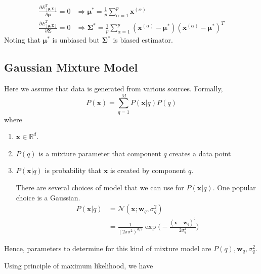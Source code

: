 \begin{align*}
	\frac{ \partial	E^T_{[ \boldsymbol{\mu}, \boldsymbol{\Sigma} ]}}{ \partial \boldsymbol{\mu}} =0 &\Rightarrow \boldsymbol{\mu}^* = \frac{1}{p} \sum_{\alpha=1}^{p}\boldsymbol{x}^{(\alpha)}\\
		\frac{ \partial	E^T_{[ \boldsymbol{\mu}, \boldsymbol{\Sigma} ]}}{ \partial \boldsymbol{\Sigma}} =0 &\Rightarrow \boldsymbol{\Sigma}^* = \frac{1}{p} \sum_{\alpha=1}^{p}(\boldsymbol{x}^{(\alpha)}-\boldsymbol{\mu}^*)(\boldsymbol{x}^{(\alpha)}-\boldsymbol{\mu}^*)^T
\end{align*}
Noting that $\boldsymbol{\mu}^*$ is unbiased but $\boldsymbol{\Sigma}^*$ is biased estimator.

\subsection{Gaussian Mixture Model}
Here we assume that data is generated from various sources. Formally, 
$$
P(\boldsymbol{x}) = \sum_{q=1}^{M} P(\boldsymbol{x}|q)P(q)
$$
where
\begin{enumerate}
	\item $\boldsymbol{x} \in \mathbb{R}^d$.
	\item $P(q)$ is a mixture parameter that component $q$ creates a data point
	\item $P(\boldsymbol{x}|q)$ is probability that $\boldsymbol{x}$ is created by component $q$.
	
	There are several choices of model that we can use for $P(\boldsymbol{x}|q)$. One popular choice is a Gaussian. 
\begin{align*}
		P(\boldsymbol{x}|q) &= \mathcal{N}(\boldsymbol{x}; \boldsymbol{w}_q, \sigma_q^2 ) \\
		&= \frac{1}{(2\pi\sigma^2)^{d/2}}\exp{ \bigg( - \frac{(\boldsymbol{x}-\boldsymbol{w}_q)^2}{2\sigma^2_q} \bigg) }
\end{align*}

\end{enumerate}


Hence, parameters to determine for this kind of mixture model are $P(q), \boldsymbol{w}_q, \sigma^2_q$.

Using principle of maximum likelihood, we have


